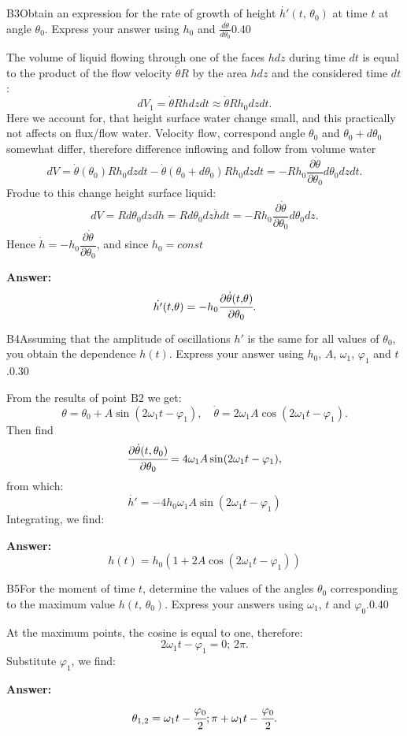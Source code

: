 \documentclass[11pt,a4paper]{article}
\begin{document}
\begin{solcard}{B3}{Obtain an expression for the rate of growth of height $\dot{h'}(t{,}\,\theta_0)$ at time $t$ at angle $\theta_0$. Express your answer using $h_0$ and $\frac{d\dot{\theta}}{d\theta _0}$}{0.40}

The volume of liquid flowing through one of the faces $hdz$ during time $dt$ is equal to the product of the flow velocity $\dot{\theta} R$ by the area $hdz$ and the considered time $dt$: $$ dV_1 = \dot{\theta} R h dz dt \approx \dot{\theta} R h_0 dz dt. $$ Here we account for, that height surface water change small, and this practically not affects on flux/flow water. Velocity flow, correspond angle $\theta_0$ and $\theta_0 + d \theta_0$ somewhat differ, therefore difference inflowing and follow from volume water $$ dV = \dot{\theta}(\theta_0) R h_0 dz dt -\dot{\theta}(\theta_0+ d\theta_0) R h_0 dz dt = -Rh_0 \frac{\partial \dot{\theta}}{\partial \theta_0}d\theta_0 dz dt. $$ Frodue to this change height surface liquid: $$ dV = Rd\theta_0 dz dh = R d\theta_0 dz \dot{h} dt = -Rh_0 \frac{\partial \dot{\theta}}{\partial \theta_0}d\theta_0 dz. $$ Hence $\dot{h} = - h_0\dfrac{\partial \dot{\theta}}{\partial \theta_0}$, and since $h_0 = const$

\par\smallskip\noindent\textbf{Answer:} $$\dot{h'}(t{,}\theta)=-h_0\cfrac{\partial\dot{\theta}(t{,}\theta)}{\partial{\theta}_0}. $$
\end{solcard}

\begin{solcard}{B4}{Assuming that the amplitude of oscillations $h'$ is the same for all values of $\theta_0$, you obtain the dependence $h(t)$. Express your answer using $h_0$, $A$, $\omega_1$, $\varphi_1$ and $t$.}{0.30}

From the results of point $\mathrm{B2}$ we get: $$\theta=\theta_0 + A\sin(2\omega_1t-\varphi_1), \quad {\dot\theta=2\omega_1A\cos(2\omega_1t-\varphi_1)}.$$ Then find $${\cfrac{\partial\dot\theta(t,\theta_0)}{\partial\theta_0}=4\omega_1A\sin(2\omega_1t-\varphi_1)}, $$ from which: $$\dot{h'}=-4h_0\omega_1A\sin(2\omega_1t-\varphi_1) $$ Integrating, we find:

\par\smallskip\noindent\textbf{Answer:} $$h(t)=h_0(1+2A\cos(2\omega_1t-\varphi_1)) $$
\end{solcard}

\begin{solcard}{B5}{For the moment of time $t$, determine the values of the angles $\theta_0$ corresponding to the maximum value $h(t{,}\,\theta_0)$. Express your answers using $\omega_1$, $t$ and $\varphi_0$.}{0.40}

At the maximum points, the cosine is equal to one, therefore: $$2\omega_1t-\varphi_1=0{;}\,2\pi. $$ Substitute $\varphi_1$, we find:

\par\smallskip\noindent\textbf{Answer:} $$\theta_{1{,}2}=\omega_1t-\cfrac{\varphi_0}{2}{;}\,\pi+\omega_1t-\cfrac{\varphi_0}{2}. $$
\end{solcard}
\end{document}
